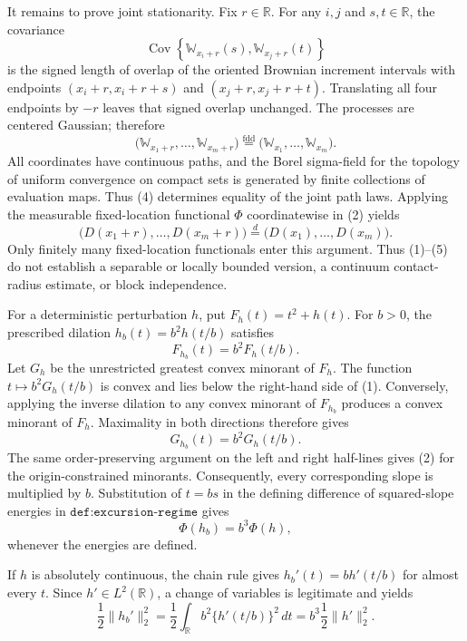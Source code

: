 It remains to prove joint stationarity.  Fix \(r\in\mathbb R\).  For any \(i,j\) and \(s,t\in\mathbb R\), the covariance
\[
 \operatorname{Cov}\!\left\{\mathbb W_{x_i+r}(s),\mathbb W_{x_j+r}(t)\right\}
\]
is the signed length of overlap of the oriented Brownian increment intervals with endpoints \((x_i+r,x_i+r+s)\) and \((x_j+r,x_j+r+t)\).  Translating all four endpoints by \(-r\) leaves that signed overlap unchanged.  The processes are centered Gaussian; therefore
\[
 \bigl(\mathbb W_{x_1+r},\ldots,\mathbb W_{x_m+r}\bigr)
 \stackrel{\mathrm{fdd}}{=}
 \bigl(\mathbb W_{x_1},\ldots,\mathbb W_{x_m}\bigr). \tag{4}
\]
All coordinates have continuous paths, and the Borel sigma-field for the topology of uniform convergence on compact sets is generated by finite collections of evaluation maps.  Thus (4) determines equality of the joint path laws.  Applying the measurable fixed-location functional \(\Phi\) coordinatewise in (2) yields
\[
 \bigl(D(x_1+r),\ldots,D(x_m+r)\bigr)
 \stackrel{d}{=}
 \bigl(D(x_1),\ldots,D(x_m)\bigr). \tag{5}
\]
Only finitely many fixed-location functionals enter this argument.  Thus (1)--(5) do not establish a separable or locally bounded version, a continuum contact-radius estimate, or block independence.

For a deterministic perturbation \(h\), put \(F_h(t)=t^2+h(t)\).  For \(b>0\), the prescribed dilation \(h_b(t)=b^2h(t/b)\) satisfies
\[
 F_{h_b}(t)=b^2F_h(t/b). \tag{1}
\]
Let \(G_h\) be the unrestricted greatest convex minorant of \(F_h\).  The function \(t\mapsto b^2G_h(t/b)\) is convex and lies below the right-hand side of (1).  Conversely, applying the inverse dilation to any convex minorant of \(F_{h_b}\) produces a convex minorant of \(F_h\).  Maximality in both directions therefore gives
\[
 G_{h_b}(t)=b^2G_h(t/b). \tag{2}
\]
The same order-preserving argument on the left and right half-lines gives (2) for the origin-constrained minorants.  Consequently, every corresponding slope is multiplied by \(b\).  Substitution of \(t=bs\) in the defining difference of squared-slope energies in \(\texttt{def:excursion-regime}\) gives
\[
 \Phi(h_b)=b^3\Phi(h), \tag{3}
\]
whenever the energies are defined.

If \(h\) is absolutely continuous, the chain rule gives \(h_b'(t)=b h'(t/b)\) for almost every \(t\).  Since \(h'\in L^2(\mathbb R)\), a change of variables is legitimate and yields
\[
 \frac12\lVert h_b'\rVert_2^2
 =\frac12\int_{\mathbb R}b^2\{h'(t/b)\}^2\,dt
 =b^3\frac12\lVert h'\rVert_2^2. \tag{4}
\]

